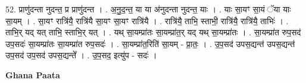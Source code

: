 \documentclass[17pt]{extarticle}
\begin{document}
52. प्राणु॑दन्ता नुदन्त॒ प्र प्राणु॑दन्त । . अ॒नु॒द॒न्त॒ या या अ॑नुदन्ता नुदन्त॒ याः । . याः सा॒यꣳ सा॒यं ॅया याः सा॒यम् । . सा॒यꣳ रात्रि॑यै॒ रात्रि॑यै सा॒यꣳ सा॒यꣳ रात्रि॑यै । . रात्रि॑यै॒ ताभि॒ स्ताभी॒ रात्रि॑यै॒ रात्रि॑यै॒ ताभिः॑ । . ताभि॒र् यद् यत् ताभि॒ स्ताभि॒र् यत् । . यथ् सा॒यम्प्रा॑तः सा॒यम्प्रा॑त॒र् यद् यथ् सा॒यम्प्रा॑तः । . सा॒यम्प्रा॑त रुप॒सद॑ उप॒सदः॑ सा॒यम्प्रा॑तः सा॒यम्प्रा॑त रुप॒सदः॑ । . सा॒यम्प्रा॑त॒रिति॑ सा॒यम् - प्रा॒तः॒ । . उ॒प॒सद॑ उपस॒द्यन्त॑ उपस॒द्यन्त॑ उप॒सद॑ उप॒सद॑ उपस॒द्यन्ते᳚ । . उ॒प॒सद॒ इत्यु॑प - सदः॑ । \newline

\textbf{Ghana Paata } \newline
\end{document}
